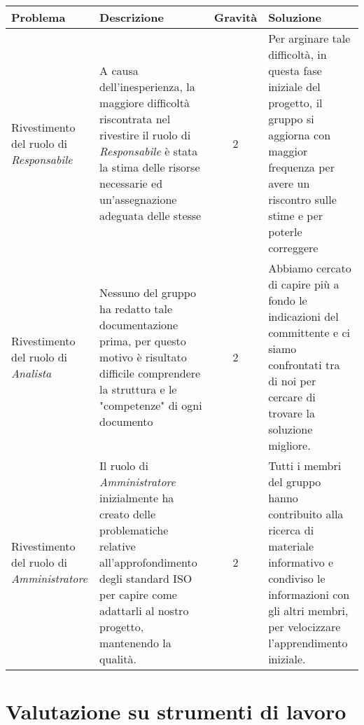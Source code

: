 {{	\begin{center}
		\renewcommand{\arraystretch}{1.4}
		\begin{tabularx}{\textwidth}{|X|X|c|X|}
			\hline
			\rowcolor{airforceblue}
			\textbf{Problema} & \textbf{Descrizione} & \textbf{Gravità} & \textbf{Soluzione}\\
			\hline
			Rivestimento del ruolo di \textit{Responsabile} &A causa dell'inesperienza, la maggiore difficoltà riscontrata nel rivestire il ruolo di \textit{Responsabile} è stata la stima delle risorse necessarie ed un'assegnazione adeguata delle stesse & 2 & Per arginare tale difficoltà,  in questa fase iniziale del progetto, il gruppo si aggiorna con maggior frequenza per avere un riscontro sulle stime e per poterle correggere \\
			\hline
			Rivestimento del ruolo di \textit{Analista}& Nessuno del gruppo ha redatto tale documentazione prima, per questo motivo è risultato difficile comprendere la struttura e le "competenze" di ogni documento & 2 & Abbiamo cercato di capire più a fondo le indicazioni del committente e ci siamo confrontati tra di noi per cercare di trovare la soluzione migliore. \\
			\hline
			Rivestimento del ruolo di \textit{Amministratore} & Il ruolo di \textit{Amministratore} inizialmente ha creato delle problematiche relative all'approfondimento degli standard ISO per capire come adattarli al nostro progetto, mantenendo la qualità. & 2 & Tutti i membri del gruppo hanno contribuito alla ricerca di materiale informativo e condiviso le informazioni con gli altri membri, per velocizzare l'apprendimento iniziale. \\
			\hline
		\end{tabularx}
	\end{center}
\clearpage

\section{Valutazione su strumenti di lavoro}  \label{ValutazionePerIlMiglioramentoValutazioneSuStrumentiDiLavoro}

\quad
\def\tabularxcolumn#1{m{#1}}
{
	
}}}
